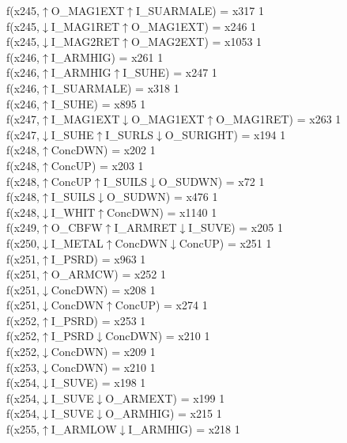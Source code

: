 f(x245,$\uparrow$O\_MAG1EXT$\uparrow$I\_SUARMALE) = x317 {1} \\
f(x245,$\downarrow$I\_MAG1RET$\uparrow$O\_MAG1EXT) = x246 {1} \\
f(x245,$\downarrow$I\_MAG2RET$\uparrow$O\_MAG2EXT) = x1053 {1} \\
f(x246,$\uparrow$I\_ARMHIG) = x261 {1} \\
f(x246,$\uparrow$I\_ARMHIG$\uparrow$I\_SUHE) = x247 {1} \\
f(x246,$\uparrow$I\_SUARMALE) = x318 {1} \\
f(x246,$\uparrow$I\_SUHE) = x895 {1} \\
f(x247,$\uparrow$I\_MAG1EXT$\downarrow$O\_MAG1EXT$\uparrow$O\_MAG1RET) = x263 {1} \\
f(x247,$\downarrow$I\_SUHE$\uparrow$I\_SURLS$\downarrow$O\_SURIGHT) = x194 {1} \\
f(x248,$\uparrow$ConcDWN) = x202 {1} \\
f(x248,$\uparrow$ConcUP) = x203 {1} \\
f(x248,$\uparrow$ConcUP$\uparrow$I\_SUILS$\downarrow$O\_SUDWN) = x72 {1} \\
f(x248,$\uparrow$I\_SUILS$\downarrow$O\_SUDWN) = x476 {1} \\
f(x248,$\downarrow$I\_WHIT$\uparrow$ConcDWN) = x1140 {1} \\
f(x249,$\uparrow$O\_CBFW$\uparrow$I\_ARMRET$\downarrow$I\_SUVE) = x205 {1} \\
f(x250,$\downarrow$I\_METAL$\uparrow$ConcDWN$\downarrow$ConcUP) = x251 {1} \\
f(x251,$\uparrow$I\_PSRD) = x963 {1} \\
f(x251,$\uparrow$O\_ARMCW) = x252 {1} \\
f(x251,$\downarrow$ConcDWN) = x208 {1} \\
f(x251,$\downarrow$ConcDWN$\uparrow$ConcUP) = x274 {1} \\
f(x252,$\uparrow$I\_PSRD) = x253 {1} \\
f(x252,$\uparrow$I\_PSRD$\downarrow$ConcDWN) = x210 {1} \\
f(x252,$\downarrow$ConcDWN) = x209 {1} \\
f(x253,$\downarrow$ConcDWN) = x210 {1} \\
f(x254,$\downarrow$I\_SUVE) = x198 {1} \\
f(x254,$\downarrow$I\_SUVE$\downarrow$O\_ARMEXT) = x199 {1} \\
f(x254,$\downarrow$I\_SUVE$\downarrow$O\_ARMHIG) = x215 {1} \\
f(x255,$\uparrow$I\_ARMLOW$\downarrow$I\_ARMHIG) = x218 {1} \\
